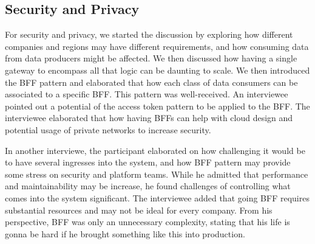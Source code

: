 \documentclass[a4paper,11pt,article,oneside]{memoir}
\begin{document}
\subsection{Security and Privacy}

For security and privacy, we started the discussion by exploring how different companies and regions may have different requirements, and how consuming data from data producers might be affected. We then discussed how having a single gateway to encompass all that logic can be daunting to scale. We then introduced the BFF pattern and elaborated that how each class of data consumers can be associated to a specific BFF. This pattern was well-received. An interviewee pointed out a potential of the access token pattern to be applied to the BFF. The interviewee elaborated that how having BFFs can help with cloud design and potential usage of private networks to increase security. 


In another interviewe, the participant elaborated on how challenging it would be to have several ingresses into the system, and how BFF pattern may provide some stress on security and platform teams. While he admitted that performance and maintainability may be increase, he found challenges of controlling what comes into the system significant. The interviewee added that going BFF requires substantial resources and may not be ideal for every company. From his perspective, BFF was only an unnecessary complexity, stating that his life is gonna be hard if he brought something like this into production.

\end{document}
